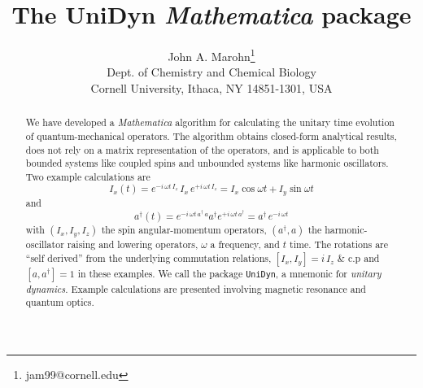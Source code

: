 \documentclass[12pt,letterpaper]{refart}
\begin{document}
\sloppy

\title{The UniDyn \emph{Mathematica} package}
\author{
	John A. Marohn\thanks{jam99@cornell.edu} \\ 
	{\footnotesize Dept. of Chemistry and Chemical Biology} \\ 
	{\footnotesize Cornell University, Ithaca, NY 14851-1301, USA}
}
\maketitle

\begin{abstract}
We have developed a \emph{Mathematica} algorithm for calculating the unitary time evolution of quantum-mechanical operators.  The algorithm obtains closed-form analytical results, does not rely on a matrix representation of the operators, and is applicable to both bounded systems like coupled spins and unbounded systems like harmonic oscillators.  Two example calculations are  
\[
	I_{x}(t) 
		= e^{-i \, \omega t \, I_z} \, I_x \, e^{+i \, \omega t \, I_z} 
		= I_x \cos{\omega t} + I_y \sin{\omega t}
\]
and
\[
	a^{\dagger}(t)
		= e^{-i \, \omega t \, a^{\dagger} \, a} a^{\dagger} e^{+i \, \omega t \, a^{\dagger}} 
		= a^{\dagger} \, e^{-i \, \omega t}
\] 
with $(I_x, I_y, I_z)$ the spin angular-momentum operators, $(a^{\dagger}, a)$ the harmonic-oscillator raising and lowering operators, $\omega$ a frequency, and $t$ time.  The rotations are ``self derived'' from the underlying commutation relations, $[I_x, I_y] = i \, I_z$ \& c.p and $[a, a^{\dagger}] = 1$ in these examples.  We call the package \verb+UniDyn+, a mnemonic for \emph{unitary dynamics}.  Example calculations are presented involving magnetic resonance and quantum optics.  
\end{abstract}

\pagestyle{fancy}  %

	\cfoot{\thepage}
	
\renewcommand{\headrulewidth}{0.4pt} %
\renewcommand{\footrulewidth}{0.4pt} %
\end{document}
